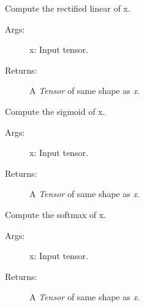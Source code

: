 \documentclass[letterpaper,10pt,english]{sphinxmanual}
\begin{document}

\begin{fulllineitems}
\label{legonet:legonet.activations.relu}
Compute the rectified linear of x.
\begin{description}
\item[{Args:}] \leavevmode
x: Input tensor.

\item[{Returns:}] \leavevmode
A \emph{Tensor} of same shape as \emph{x}.

\end{description}

\end{fulllineitems}


\begin{fulllineitems}
\label{legonet:legonet.activations.sigmoid}
Compute the sigmoid of x.
\begin{description}
\item[{Args:}] \leavevmode
x: Input tensor.

\item[{Returns:}] \leavevmode
A \emph{Tensor} of same shape as \emph{x}.

\end{description}

\end{fulllineitems}


\begin{fulllineitems}
\label{legonet:legonet.activations.softmax}
Compute the softmax of x.
\begin{description}
\item[{Args:}] \leavevmode
x: Input tensor.

\item[{Returns:}] \leavevmode
A \emph{Tensor} of same shape as \emph{x}.

\end{description}

\end{fulllineitems}

\end{document}
